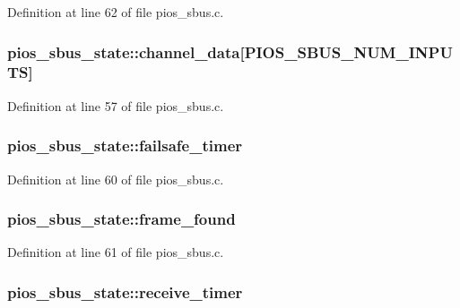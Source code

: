 Definition at line 62 of file pios\-\_\-sbus.\-c.

\hypertarget{structpios__sbus__state_ac6e4db09887aa141183e800d990ad794}{
\subsubsection[{channel\-\_\-data}]{ pios\-\_\-sbus\-\_\-state\-::channel\-\_\-data\mbox{[}P\-I\-O\-S\-\_\-\-S\-B\-U\-S\-\_\-\-N\-U\-M\-\_\-\-I\-N\-P\-U\-T\-S\mbox{]}}}\label{structpios__sbus__state_ac6e4db09887aa141183e800d990ad794}


Definition at line 57 of file pios\-\_\-sbus.\-c.

\hypertarget{structpios__sbus__state_a5238707dcd8e68afb924becd99a5ea83}{
\subsubsection[{failsafe\-\_\-timer}]{ pios\-\_\-sbus\-\_\-state\-::failsafe\-\_\-timer}}\label{structpios__sbus__state_a5238707dcd8e68afb924becd99a5ea83}


Definition at line 60 of file pios\-\_\-sbus.\-c.

\hypertarget{structpios__sbus__state_a44f2ee1a5d510745a695cd8a38324559}{
\subsubsection[{frame\-\_\-found}]{ pios\-\_\-sbus\-\_\-state\-::frame\-\_\-found}}\label{structpios__sbus__state_a44f2ee1a5d510745a695cd8a38324559}


Definition at line 61 of file pios\-\_\-sbus.\-c.

\hypertarget{structpios__sbus__state_a064c8174115b5d3e710a97e8a0df781f}{
\subsubsection[{receive\-\_\-timer}]{ pios\-\_\-sbus\-\_\-state\-::receive\-\_\-timer}}\label{structpios__sbus__state_a064c8174115b5d3e710a97e8a0df781f}


